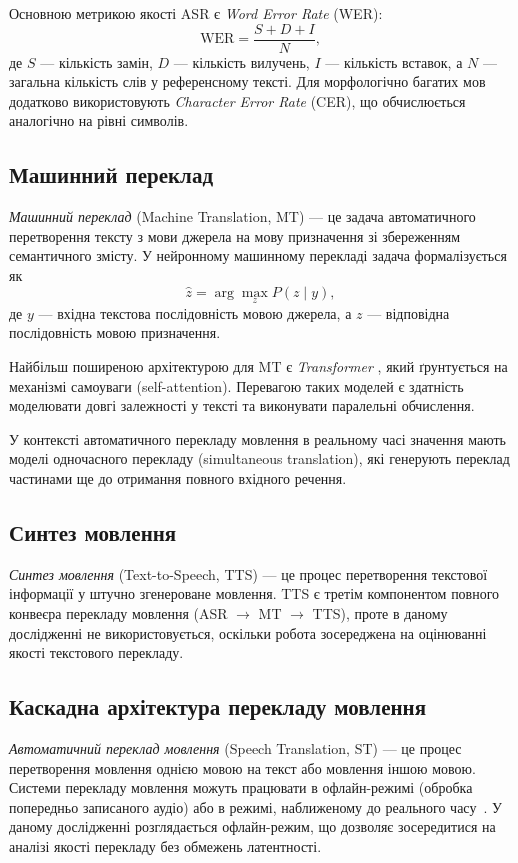 Основною метрикою якості ASR є \textit{Word Error Rate} (WER):
\[
\text{WER} = \frac{S + D + I}{N},
\]
де $S$ --- кількість замін, $D$ --- кількість вилучень, $I$ --- кількість вставок,
а $N$ --- загальна кількість слів у референсному тексті. Для морфологічно багатих
мов додатково використовують \textit{Character Error Rate} (CER), що обчислюється
аналогічно на рівні символів.

\subsection{Машинний переклад}

\textit{Машинний переклад} (Machine Translation, MT) --- це задача автоматичного
перетворення тексту з мови джерела на мову призначення зі збереженням
семантичного змісту. У нейронному машинному перекладі задача формалізується як
\[
\hat{z} = \arg\max_{z} P(z \mid y),
\]
де $y$ --- вхідна текстова послідовність мовою джерела, а $z$ --- відповідна
послідовність мовою призначення.

Найбільш поширеною архітектурою для MT є \textit{Transformer} \cite{vaswani}, який
ґрунтується на механізмі самоуваги (self-attention). Перевагою таких моделей є
здатність моделювати довгі залежності у тексті та виконувати паралельні
обчислення.

У контексті автоматичного перекладу мовлення в реальному часі значення мають
моделі одночасного перекладу (simultaneous translation), які генерують переклад
частинами ще до отримання повного вхідного речення.

\subsection{Синтез мовлення}

\textit{Синтез мовлення} (Text-to-Speech, TTS) --- це процес перетворення текстової
інформації у штучно згенероване мовлення. TTS є третім компонентом повного
конвеєра перекладу мовлення (ASR $\to$ MT $\to$ TTS), проте в даному
дослідженні не використовується, оскільки робота зосереджена на оцінюванні
якості текстового перекладу.

\subsection{Каскадна архітектура перекладу мовлення}
\label{subsec:cascade}

\textit{Автоматичний переклад мовлення} (Speech Translation, ST) --- це процес
перетворення мовлення однією мовою на текст або мовлення іншою мовою.
Системи перекладу мовлення можуть працювати в офлайн-режимі (обробка
попередньо записаного аудіо) або в режимі, наближеному до реального
часу~\cite{real_time}. У даному дослідженні розглядається офлайн-режим,
що дозволяє зосередитися на аналізі якості перекладу без обмежень
латентності.

